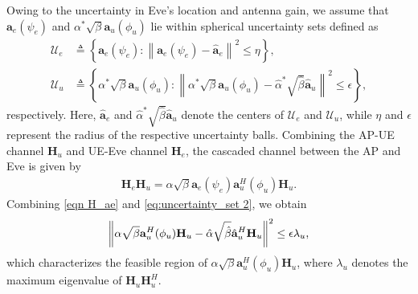 \documentclass[journal]{IEEEtran}
\begin{document}
Owing to the uncertainty in Eve’s location and antenna gain, we assume that $\mathbf{a}_e(\psi_e)$ and $\alpha^*\sqrt{\beta}\mathbf{a}_u(\phi_u)$ lie within spherical uncertainty sets defined as
\begin{subequations}\label{eq:uncertainty_set}
\begin{align}
\mathcal{U}_e &\triangleq \left\{\mathbf{a}_e(\psi_e) : \left\|\mathbf{a}_e(\psi_e) - \hat{\mathbf{a}}_e\right\|^2 \leq \eta\right\}, \label{eq:uncertainty_set 1}\\
\mathcal{U}_u &\triangleq \left\{\alpha^*\sqrt{\beta}\mathbf{a}_u(\phi_u) : \left\|\alpha^*\sqrt{\beta}\mathbf{a}_u(\phi_u) - \hat{\alpha}^*\sqrt{\hat{\beta}}\hat{\mathbf{a}}_u\right\|^2 \leq \epsilon\right\}, \label{eq:uncertainty_set 2}
\end{align}
\end{subequations}
respectively. Here, $\hat{\mathbf{a}}_e$ and $\hat{\alpha}^*\sqrt{\hat{\beta}}\hat{\mathbf{a}}_u$ denote the centers of $\mathcal{U}_e$ and $\mathcal{U}_u$, while $\eta$ and $\epsilon$ represent the radius of the respective uncertainty balls. Combining the AP-UE channel $\mathbf{H}_u$ and UE-Eve channel $\mathbf{H}_e$, the cascaded channel between the AP and Eve is given by
\begin{align}
\mathbf{H}_e \mathbf{H}_u = \alpha\sqrt{\beta} \mathbf{a}_e(\psi_e) \mathbf{a}_u^H(\phi_u) \mathbf{H}_u. \label{eqn H_ae}
\end{align}
Combining \eqref{eqn H_ae} and \eqref{eq:uncertainty_set 2}, we obtain
\begin{align}
\left\|{\alpha}\sqrt{\beta}\mathbf{a}_u^H(\phi_u) \mathbf{H}_u - \hat{\alpha}\sqrt{\hat{\beta}}\hat{\mathbf{a}}_u^H \mathbf{H}_u\right\|^2
\leq \epsilon \lambda_u,\label{eqn bar{a} region}
\end{align}
which characterizes the feasible region of $\alpha\sqrt{\beta}\mathbf{a}_u^H(\phi_u) \mathbf{H}_u$, where $\lambda_u$ denotes the maximum eigenvalue of $\mathbf{H}_u\mathbf{H}_u^H$.
\end{document}
